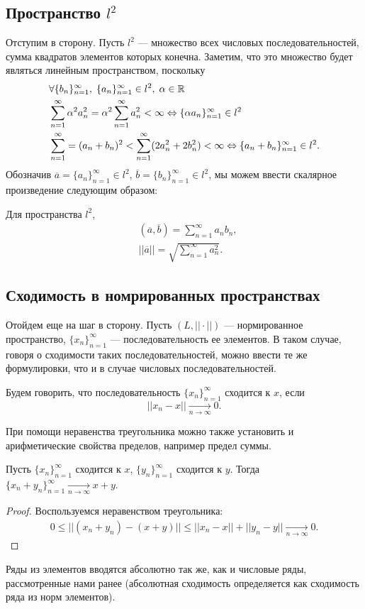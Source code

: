 \subsection{Пространство $l^2$}
Отступим в сторону.
Пусть $l^2$ --- множество всех числовых последовательностей, сумма квадратов элементов которых конечна. Заметим, что это множество будет являться линейным пространством, поскольку
\begin{align*}
    &\forall \{b_n\}_{n=1}^{\infty},\; \{a_n\}_{n=1}^{\infty} \in l^2,\; \alpha \in \mathbb{R}\\
    &\sum\limits_{n=1}^{\infty} \alpha^2 a_n^2 = \alpha^2 \sum\limits_{n=1}^{\infty} a_n^2 < \infty \Leftrightarrow \{\alpha a_n\}_{n=1}^{\infty} \in l^2\\
    &\sum\limits_{n=1}^{\infty} = (a_n+b_n)^2< \sum\limits_{n=1}^{\infty} (2a_n^2 + 2b_n^2) < \infty \Leftrightarrow \{a_n + b_n\}_{n=1}^{\infty} \in l^2.
\end{align*}
Обозначив $\overline{a} = \{a_n\}_{n=1}^{\infty}\in l^2$, $\overline{b} = \{b_n\}_{n=1}^{\infty} \in l^2$, мы можем ввести скалярное произведение следующим образом:
\begin{Def}
    Для пространства $l^2$, 
    \begin{align*}
        &(\overline{a}, \overline{b}) = \sum\limits_{n=1}^{\infty} a_nb_n,\\
        &||\overline{a}|| = \sqrt{\sum\limits_{n=1}^{\infty}a_n^2}.
    \end{align*}
\end{Def}
\subsection{Сходимость в номрированных пространствах}
Отойдем еще на шаг в сторону. Пусть $(L, ||\cdot||)$ --- нормированное пространство, $\{x_n\}_{n=1}^{\infty}$ --- последовательность ее элементов. В таком случае, говоря о сходимости таких последовательностей, можно ввести те же формулировки, что и в случае числовых последовательностей.
\begin{Def}
    Будем говорить, что последовательность $\{x_n\}_{n=1}^{\infty}$ сходится к $x$, если 
    $$
        ||x_n - x|| \underset{n\to \infty}{\to} 0.
    $$
\end{Def}
При помощи неравенства треугольника можно также установить и арифметические свойства пределов, например предел суммы.
\begin{Statement}
    Пусть $\{x_n\}_{n=1}^{\infty}$ сходится к $x$, $\{y_n\}_{n=1}^{\infty}$ сходится к $y$. Тогда  $\{x_n + y_n\}_{n=1}^{\infty} \underset{n\to \infty}{\to} x+y$.
\end{Statement}
\begin{proof}
    Воспользуемся неравенством треугольника:
    \begin{gather*}
        0\leqslant ||(x_n + y_n) - (x + y)|| \leqslant ||x_n-x|| + ||y_n - y|| \underset{n\to\infty}{\to} 0.
    \end{gather*}
\end{proof}
Ряды из элементов вводятся абсолютно так же, как и числовые ряды, рассмотренные нами ранее (абсолютная сходимость определяется как сходимость ряда из норм элементов).


